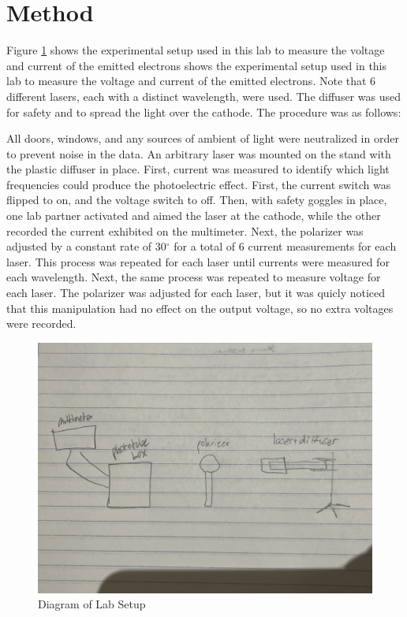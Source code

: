 \documentclass{article}[12pt]
\begin{document}
\section{Method}

Figure \ref{methods} shows the experimental setup used in this lab to measure the voltage and current of the emitted electrons shows the experimental setup used in this lab to measure the voltage and current of the emitted electrons.
Note that 6 different lasers, each with a distinct wavelength, were used.
The diffuser was used for safety and to spread the light over the cathode. 
The procedure was as follows:

All doors, windows, and any sources of ambient of light were neutralized in order to prevent noise in the data.
An arbitrary laser was mounted on the stand with the plastic diffuser in place.
First, current was measured to identify which light frequencies could produce the photoelectric effect.
First, the current switch was flipped to on, and the voltage switch to off.
Then, with safety goggles in place, one lab partner activated and aimed the laser at the cathode, while the other recorded the current exhibited on the multimeter.
Next, the polarizer was adjusted by a constant rate of 30$ {}^{\circ} $ for a total of 6 current measurements for each laser.
This process was repeated for each laser until currents were measured for each wavelength.
Next, the same process was repeated to measure voltage for each laser.
The polarizer was adjusted for each laser, but it was quicly noticed that this manipulation had no effect on the output voltage, so no extra voltages were recorded.

\begin{figure}[H]
\centering
\includegraphics[scale=0.1]{figures/methods.jpeg}
\caption{Diagram of Lab Setup}
\label{methods}
\end{figure}
\end{document}
